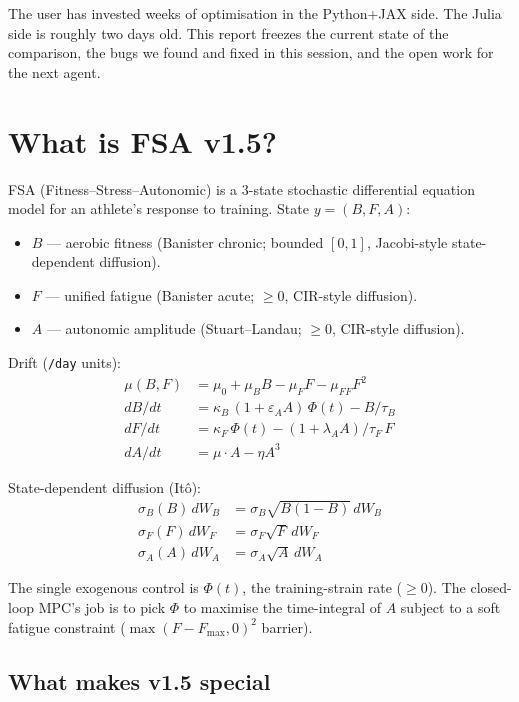 \documentclass[11pt,a4paper]{article}
\begin{document}
The user has invested weeks of optimisation in the Python+JAX
side. The Julia side is roughly two days old. This report freezes
the current state of the comparison, the bugs we found and fixed
in this session, and the open work for the next agent.

\section{What is FSA v1.5?}

FSA (Fitness--Stress--Autonomic) is a 3-state stochastic
differential equation model for an athlete's response to
training. State $y = (B, F, A)$:

\begin{itemize}[itemsep=2pt]
  \item $B$ --- aerobic fitness (Banister chronic; bounded
        $[0, 1]$, Jacobi-style state-dependent diffusion).
  \item $F$ --- unified fatigue (Banister acute; $\geq 0$,
        CIR-style diffusion).
  \item $A$ --- autonomic amplitude (Stuart--Landau; $\geq 0$,
        CIR-style diffusion).
\end{itemize}

Drift (\texttt{/day} units):
\begin{align*}
  \mu(B, F)        &= \mu_0 + \mu_B B - \mu_F F - \mu_{FF} F^2 \\
  dB/dt            &= \kappa_B \, (1 + \varepsilon_A A) \, \Phi(t) - B / \tau_B \\
  dF/dt            &= \kappa_F \, \Phi(t) - (1 + \lambda_A A) / \tau_F \, F \\
  dA/dt            &= \mu \cdot A - \eta A^3
\end{align*}

State-dependent diffusion (It\^o):
\begin{align*}
  \sigma_B(B) \, dW_B &= \sigma_B \sqrt{B(1-B)} \, dW_B \\
  \sigma_F(F) \, dW_F &= \sigma_F \sqrt{F} \, dW_F \\
  \sigma_A(A) \, dW_A &= \sigma_A \sqrt{A} \, dW_A
\end{align*}

The single exogenous control is $\Phi(t)$, the training-strain
rate ($\geq 0$). The closed-loop MPC's job is to pick $\Phi$ to
maximise the time-integral of $A$ subject to a soft fatigue
constraint ($\max(F - F_{\max}, 0)^2$ barrier).

\subsection{What makes v1.5 special}
\end{document}
